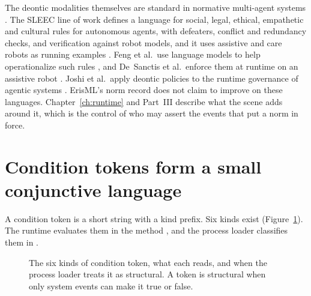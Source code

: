 The deontic modalities themselves are standard in normative multi-agent systems
\cite{boella2006normative}. The SLEEC line of work defines a language for social, legal, ethical,
empathetic and cultural rules for autonomous agents, with defeaters, conflict and redundancy checks,
and verification against robot models, and it uses assistive and care robots as running examples
\cite{getiryaman2023sleec,getiryaman2024sleectoolkit,getiryaman2025sleecjss,ribeiro2026sleecframework}.
Feng et al.\ use language models to help operationalize such rules \cite{feng2024normative}, and
De~Sanctis et al.\ enforce them at runtime on an assistive robot \cite{desanctis2026sleecruntime}.
Joshi et al.\ apply deontic policies to the runtime governance of agentic systems
\cite{joshi2026deontic}. ErisML's norm record does not claim to improve on these languages.
Chapter~\ref{ch:runtime} and Part~III describe what the scene adds around it, which is the control
of who may assert the events that put a norm in force.

\section{Condition tokens form a small conjunctive language}\label{sec:erisml-tokens}

A condition token is a short string with a kind prefix. Six kinds exist
(Figure~\ref{fig:erisml-tokens}). The runtime evaluates them in the method , and the
process loader classifies them in .

\begin{figure}[t]
\centering

\caption{The six kinds of condition token, what each reads, and when the process loader treats it
as structural. A token is structural when only system events can make it true or false.}
\label{fig:erisml-tokens}
\end{figure}

